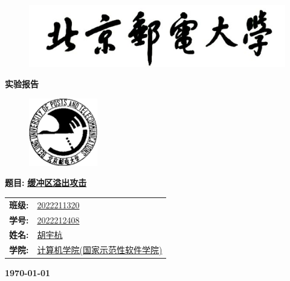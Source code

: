 \documentclass[UTF8, 12pt, a4paper, oneside]{ctexart}
\begin{document}
	\sloppy
	\thispagestyle{empty}
    \begin{figure}[t]
		\centering
		\includegraphics[width=13cm]{logo1.jpg}
	\end{figure}

    \begin{center}
        \Huge\textbf{实验报告}
    \end{center}
	\vspace*{1em}
    \begin{figure}[htbp]
		\centering
		\includegraphics[width=3cm]{logo2.jpg}
	\end{figure}
	\begin{center}
		\Huge\textbf{题目:} \underline{\textbf{缓冲区溢出攻击}} 
	\end{center}
    \vspace*{5em}
	\begin{table}[htbp]
		\centering
		\large
		\begin{tabular}{ll}
        \textbf{班级:} & \underline{2022211320} \\
		\textbf{学号:} & \underline{2022212408} \\
		\textbf{姓名:} & \underline{胡宇杭} \\
		\textbf{学院:} & \underline{计算机学院(国家示范性软件学院)} \\
		\end{tabular}
	\end{table}

    \vspace*{2em}

    \begin{center}
        \Huge\textbf{\today} 
    \end{center}

    \newpage
    \tableofcontents
    \newpage

    
    
    
    
    
    
\end{document}
